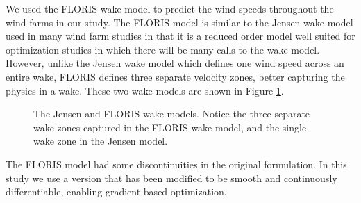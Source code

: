 We used the FLORIS wake model to predict the wind speeds throughout the wind farms in our study\cite{gebraad2016wind}. The FLORIS model is similar to the Jensen wake model used in many wind farm studies\cite{jensen1983note} in that it is a reduced order model well suited for optimization studies in which there will be many calls to the wake model. However, unlike the Jensen wake model which defines one wind speed across an entire wake, FLORIS defines three separate velocity zones, better capturing the physics in a wake. These two wake models are shown in Figure \ref{wake_models}.

\begin{figure}[htbp]
  \centering
  \caption{\label{wake_models} The Jensen and FLORIS wake models. Notice the three separate wake zones captured in the FLORIS wake model, and the single wake zone in the Jensen model.}
\end{figure}

The FLORIS model had some discontinuities in the original formulation. In this study we use a version that has been modified to be smooth and continuously differentiable\cite{thomas2017improving}, enabling gradient-based optimization.

